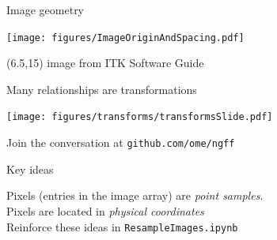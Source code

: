 \documentclass[aspectratio=169]{beamer}
\newcommand{\code}[1]{\texttt{#1}}
\newcommand\citefoot[1]{
    \begin{textblock}{12}(6.5,15)
        {\color{HHMIGrayB} \tiny #1}
    \end{textblock}
}
\newcommand\rightfoot[1]{
    \begin{textblock}{15}(0.5,13.7)
        {\color{gray} \scriptsize \hspace*{0pt}{\hfill} #1}
    \end{textblock}
}
\begin{document}
\begin{frame}{Image geometry}
    \begin{center}
        \texttt{[image: figures/ImageOriginAndSpacing.pdf]}
    \end{center}
    \citefoot{image from ITK Software Guide}
\end{frame}


\begin{frame}{Many relationships are transformations}

    \vspace{0.7em}
    \begin{center}
      \texttt{[image: figures/transforms/transformsSlide.pdf]}
    \end{center}

    \vspace{-0.4em}Join the conversation at \code{github.com/ome/ngff}

\end{frame}


%
%
%


\begin{frame}{Key ideas}

    Pixels (entries in the image array) are \emph{point samples}. \\
    \vspace{1em}
    Pixels are located in \emph{physical coordinates} \\
    \vspace{2em}
    Reinforce these ideas in \code{ResampleImages.ipynb}

\end{frame}
\end{document}
